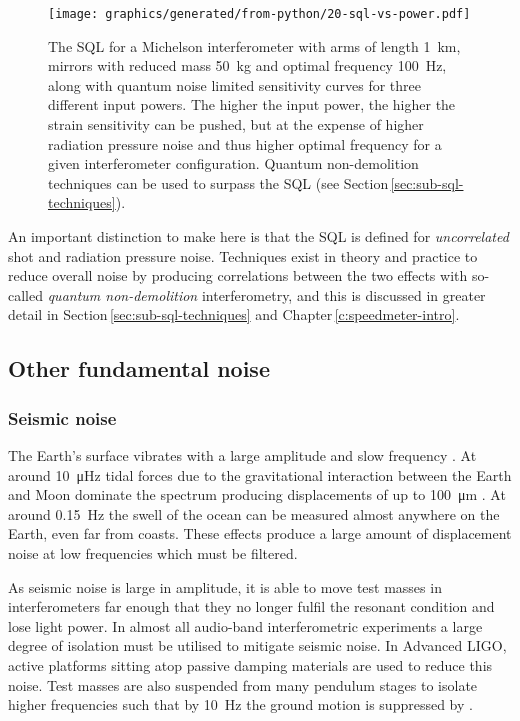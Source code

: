 \begin{figure}
  \centering
  \texttt{[image: graphics/generated/from-python/20-sql-vs-power.pdf]}
  \caption[Standard quantum limit and the quantum noise with various input powers]{\label{fig:sql-vs-input-power}The \gls{SQL} for a Michelson interferometer with arms of length \SI{1}{\kilo\meter}, mirrors with reduced mass \SI{50}{\kilo\gram} and optimal frequency \SI{100}{\hertz}, along with quantum noise limited sensitivity curves for three different input powers. The higher the input power, the higher the strain sensitivity can be pushed, but at the expense of higher radiation pressure noise and thus higher optimal frequency for a given interferometer configuration. Quantum non-demolition techniques can be used to surpass the \gls{SQL} (see Section\,\ref{sec:sub-sql-techniques}).}
\end{figure}

An important distinction to make here is that the \gls{SQL} is defined for \emph{uncorrelated} shot and radiation pressure noise. Techniques exist in theory and practice to reduce overall noise by producing correlations between the two effects with so-called \emph{quantum non-demolition} interferometry, and this is discussed in greater detail in Section\,\ref{sec:sub-sql-techniques} and Chapter\,\ref{c:speedmeter-intro}.

\subsection{Other fundamental noise}

\subsubsection{\label{sec:seismic-noise}Seismic noise}
The Earth's surface vibrates with a large amplitude and slow frequency \cite{ET2011}. At around \SI{10}{\micro\hertz} tidal forces due to the gravitational interaction between the Earth and Moon dominate the spectrum producing displacements of up to \SI{100}{\micro\meter} \cite{Adhikari2004}. At around \SI{0.15}{\hertz} the swell of the ocean can be measured almost anywhere on the Earth, even far from coasts. These effects produce a large amount of displacement noise at low frequencies which must be filtered.

As seismic noise is large in amplitude, it is able to move test masses in interferometers far enough that they no longer fulfil the resonant condition and lose light power. In almost all audio-band interferometric experiments a large degree of isolation must be utilised to mitigate seismic noise. In Advanced \gls{LIGO}, active platforms sitting atop passive damping materials are used to reduce this noise. Test masses are also suspended from many pendulum stages to isolate higher frequencies such that by \SI{10}{\hertz} the ground motion is suppressed by .

